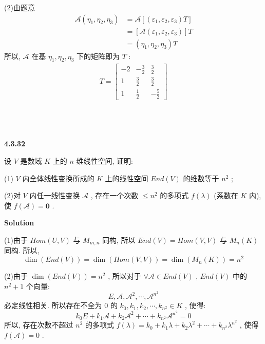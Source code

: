 \documentclass[11pt,a4paper,openany,oneside]{book}
\newcommand\Solution{\noindent\textbf{\textsf{Solution}}\par\medskip}
\begin{document}
(2)由题意
\begin{align*}
\mathcal{A}(\eta_1, \eta_2, \eta_3) &= \mathcal{A}[(\varepsilon_1, \varepsilon_2, \varepsilon_3)T]  \\ 
&=[\mathcal{A}(\varepsilon_1, \varepsilon_2, \varepsilon_3)]T  \\
&=(\eta_1, \eta_2, \eta_3)T
\end{align*}
所以,  $ \mathcal{A} $ 在基 $ \eta_1, \eta_2, \eta_3 $ 下的矩阵即为 $ T $ :
\begin{gather*}
T=
\begin{bmatrix}
-2  &  -\frac{3}{2}  &  \frac{3}{2}  \\
1  &  \frac{3}{2}    &  \frac{3}{2}  \\
1  &  \frac{1}{2}    &  -\frac{5}{2}
\end{bmatrix}
\end{gather*} \\  \\  \\


\begin{myexample}
	\textbf{4.3.32}

设 $ V $ 是数域 $ K $ 上的 $ n $ 维线性空间, 证明:

(1) $ V $ 内全体线性变换所成的 $ K $ 上的线性空间 $ End(V) $ 的维数等于 $ n^2 $ ;

(2)对 $ V $ 内任一线性变换 $ \mathcal{A} $ , 存在一个次数 $ \leq n^2 $ 的多项式 $ f(\lambda) $ (系数在 $ K $ 内), 使 $ f(\mathcal{A}) = \textbf{0} $ . \\  

\end{myexample}
\Solution

(1)由于 $ Hom(U,V) $ 与 $ M_{m,n} $ 同构, 所以 $ End(V) = Hom(V,V) $ 与 $ M_n(K) $ 同构. 所以,
 $$  \dim (End(V)) = \dim (Hom(V,V)) = \dim (M_n(K)) = n^2  $$ 

(2)由于 $ \dim (End(V))= n^2 $ , 所以对于 $ \forall \mathcal{A} \in End(V) $ ,  $ End(V) $ 中的 $ n^2+1 $ 个向量:
 $$  E, \mathcal{A}, \mathcal{A}^2, \cdots, \mathcal{A}^{n^2}  $$ 
必定线性相关. 所以存在不全为 $ 0 $ 的 $ k_0, k_1, k_2, \cdots, k_{n^2} \in K $ , 使得:
 $$  k_0E + k_1\mathcal{A} + k_2\mathcal{A}^2 + \cdots + k_{n^2}\mathcal{A^{n^2}} = 0   $$ 
所以, 存在次数不超过 $ n^2 $ 的多项式 $ f(\lambda) = k_0 + k_1\lambda + k_2\lambda^2 + \cdots + k_{n^2}\lambda^{n^2} $ , 使得 $ f(\mathcal{A}) = 0 $ . \\  \\  \\
\end{document}
